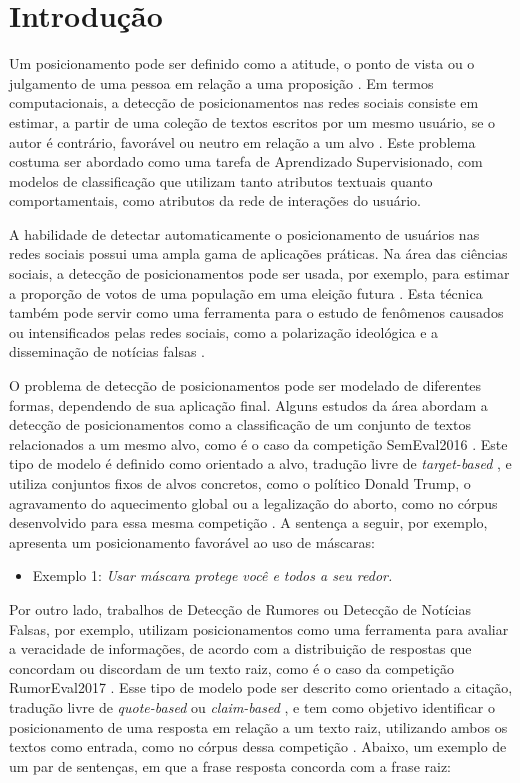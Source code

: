 \documentclass[
	12pt, oneside, a4paper, english, brazil
]{abntex2ppgsi}
\begin{document}
\textual
\chapter{Introdução}

Um posicionamento pode ser definido como a atitude, o ponto de vista ou o julgamento de uma pessoa em relação a uma proposição \cite{walid2021}. Em termos computacionais, a detecção de posicionamentos nas redes sociais consiste em estimar, a partir de uma coleção de textos escritos por um mesmo usuário, se o autor é contrário, favorável ou neutro em relação a um alvo \cite{semeval2016}. Este problema costuma ser abordado como uma tarefa de Aprendizado Supervisionado, com modelos de classificação que utilizam tanto atributos textuais quanto comportamentais, como atributos da rede de interações do usuário.

A habilidade de detectar automaticamente o posicionamento de usuários nas redes sociais possui uma ampla gama de aplicações práticas. Na área das ciências sociais, a detecção de posicionamentos pode ser usada, por exemplo, para estimar a proporção de votos de uma população em uma eleição futura \cite{isisisnotislam}. Esta técnica também pode servir como uma ferramenta para o estudo de fenômenos causados ou intensificados pelas redes sociais, como a polarização ideológica e a disseminação de notícias falsas \cite{walid2021}.

O problema de detecção de posicionamentos pode ser modelado de diferentes formas, dependendo de sua aplicação final. Alguns estudos da área abordam a detecção de posicionamentos como a classificação de um conjunto de textos relacionados a um mesmo alvo, como é o caso da competição SemEval2016 \cite{semeval2016}. Este tipo de modelo é definido como orientado a alvo, tradução livre de {\em target-based} \cite{walid2021}, e utiliza conjuntos fixos de alvos concretos, como o político Donald Trump, o agravamento do aquecimento global ou a legalização do aborto, como no córpus desenvolvido para essa mesma competição \cite{semeval2016}. A sentença a seguir, por exemplo, apresenta um posicionamento favorável ao uso de máscaras:

\begin{itemize}
    \item[] Exemplo 1: \textit{Usar máscara protege você e todos a seu redor.}
\end{itemize}

Por outro lado, trabalhos de Detecção de Rumores ou Detecção de Notícias Falsas, por exemplo, utilizam posicionamentos como uma ferramenta para avaliar a veracidade de informações, de acordo com a distribuição de respostas que concordam ou discordam de um texto raiz, como é o caso da competição RumorEval2017 \cite{rumoreval2017}. Esse tipo de modelo pode ser descrito como orientado a citação, tradução livre de {\em quote-based} ou {\em claim-based} \cite{walid2021}, e tem como objetivo identificar o posicionamento de uma resposta em relação a um texto raiz, utilizando ambos os textos como entrada, como no córpus dessa competição \cite{rumoreval2017}. Abaixo, um exemplo de um par de sentenças, em que a frase resposta concorda com a frase raiz:
\end{document}
